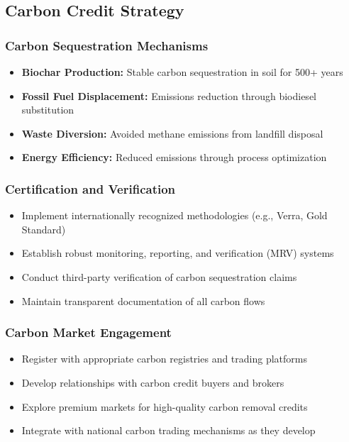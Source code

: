 \subsection{Carbon Credit Strategy}

\subsubsection{Carbon Sequestration Mechanisms}
\begin{itemize}
    \item \textbf{Biochar Production:} Stable carbon sequestration in soil for 500+ years
    \item \textbf{Fossil Fuel Displacement:} Emissions reduction through biodiesel substitution
    \item \textbf{Waste Diversion:} Avoided methane emissions from landfill disposal
    \item \textbf{Energy Efficiency:} Reduced emissions through process optimization
\end{itemize}

\subsubsection{Certification and Verification}
\begin{itemize}
    \item Implement internationally recognized methodologies (e.g., Verra, Gold Standard)
    \item Establish robust monitoring, reporting, and verification (MRV) systems
    \item Conduct third-party verification of carbon sequestration claims
    \item Maintain transparent documentation of all carbon flows
\end{itemize}

\subsubsection{Carbon Market Engagement}
\begin{itemize}
    \item Register with appropriate carbon registries and trading platforms
    \item Develop relationships with carbon credit buyers and brokers
    \item Explore premium markets for high-quality carbon removal credits
    \item Integrate with national carbon trading mechanisms as they develop
\end{itemize}

